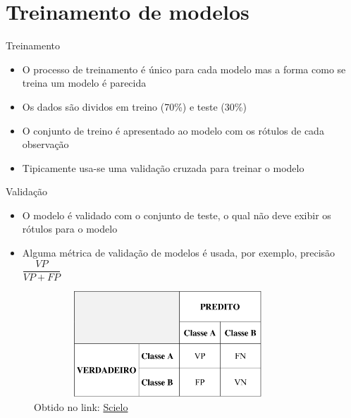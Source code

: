 \section{Treinamento de modelos}

\begin{frame}	
	\begin{block}{Treinamento}	
		\begin{itemize}
			\item O processo de treinamento é único para cada modelo mas a forma como se treina um modelo é parecida
			\item Os dados são dividos em treino (70\%) e teste (30\%)
			\item O conjunto de treino é apresentado ao modelo com os rótulos de cada observação
			\item Tipicamente usa-se uma validação cruzada para treinar o modelo
		\end{itemize}		
	\end{block}
\end{frame}

\begin{frame}	
	\begin{block}{Validação}	
		\begin{itemize}
			\item O modelo é validado com o conjunto de teste, o qual não deve exibir os rótulos para o modelo
			\item Alguma métrica de validação de modelos é usada, por exemplo, precisão $\dfrac{VP}{VP + FP}$
		\end{itemize}
				\begin{figure}[!htb]
			\centering	  				
			\includegraphics[height=4cm, width = 10cm]{./pic/matrizConfusao.png}
			\caption{Obtido no link: \href{http://www.scielo.br/pdf/eagri/v33n6/19.pdf}{Scielo} }
			\label{fig_matriz_confusao}
		\end{figure}	
	\end{block}
\end{frame}